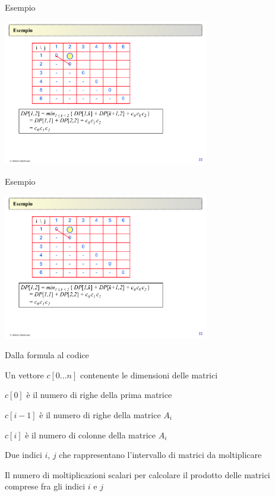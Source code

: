 \begin{frame}{Esempio}
\vspace{-12pt}
\begin{center}
\includegraphics[width=9cm,page=4]{moltmatrici.pdf}
\end{center}
\end{frame}

\begin{frame}{Esempio}
\vspace{-12pt}
\begin{center}
\includegraphics[width=9cm,page=5]{moltmatrici.pdf}
\end{center}
\end{frame}

\begin{frame}{Dalla formula al codice}

\BIL
\item Un vettore $c[0 \ldots n]$ contenente le dimensioni delle matrici
\BI
\item $c[0]$ è il numero di righe della prima matrice
\item $c[i-1]$ è il numero di righe della matrice $A_i$
\item $c[i]$ è il numero di colonne della matrice $A_i$
\EI
\item Due indici $i$, $j$ che rappresentano l'intervallo di matrici da moltiplicare
\EIL

\bigskip
{}
Il numero di moltiplicazioni scalari per calcolare il prodotto delle matrici comprese fra gli indici $i$ e $j$

\end{frame}

